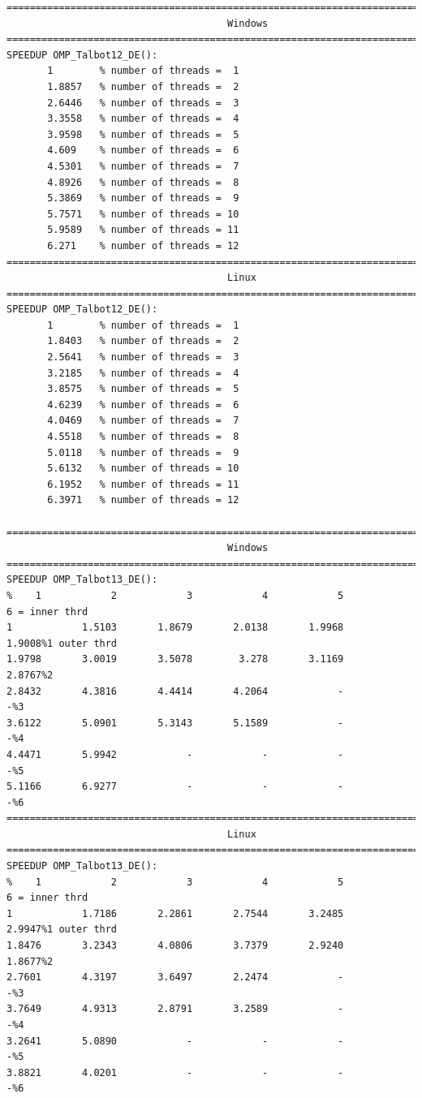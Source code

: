 \documentclass[a4paper,10pt]{report}%
\begin{document}
\begin{lstlisting}
====================================================================================
                                      Windows
====================================================================================
SPEEDUP OMP_Talbot12_DE():
       1        % number of threads =  1
       1.8857   % number of threads =  2
       2.6446   % number of threads =  3
       3.3558   % number of threads =  4
       3.9598   % number of threads =  5
       4.609    % number of threads =  6
       4.5301   % number of threads =  7
       4.8926   % number of threads =  8
       5.3869   % number of threads =  9
       5.7571   % number of threads = 10
       5.9589   % number of threads = 11
       6.271    % number of threads = 12
====================================================================================
                                      Linux
====================================================================================
SPEEDUP OMP_Talbot12_DE():
       1        % number of threads =  1
       1.8403   % number of threads =  2
       2.5641   % number of threads =  3
       3.2185   % number of threads =  4
       3.8575   % number of threads =  5
       4.6239   % number of threads =  6
       4.0469   % number of threads =  7
       4.5518   % number of threads =  8
       5.0118   % number of threads =  9
       5.6132   % number of threads = 10
       6.1952   % number of threads = 11
       6.3971   % number of threads = 12

====================================================================================
                                      Windows
====================================================================================
SPEEDUP OMP_Talbot13_DE():
%    1            2            3            4            5            6 = inner thrd
1            1.5103       1.8679       2.0138       1.9968       1.9008%1 outer thrd
1.9798       3.0019       3.5078        3.278       3.1169       2.8767%2
2.8432       4.3816       4.4414       4.2064            -            -%3
3.6122       5.0901       5.3143       5.1589            -            -%4
4.4471       5.9942            -            -            -            -%5
5.1166       6.9277            -            -            -            -%6
====================================================================================
                                      Linux
====================================================================================
SPEEDUP OMP_Talbot13_DE():
%    1            2            3            4            5            6 = inner thrd
1            1.7186       2.2861       2.7544       3.2485       2.9947%1 outer thrd
1.8476       3.2343       4.0806       3.7379       2.9240       1.8677%2
2.7601       4.3197       3.6497       2.2474            -            -%3
3.7649       4.9313       2.8791       3.2589            -            -%4
3.2641       5.0890            -            -            -            -%5
3.8821       4.0201            -            -            -            -%6
\end{lstlisting}
\end{document}
